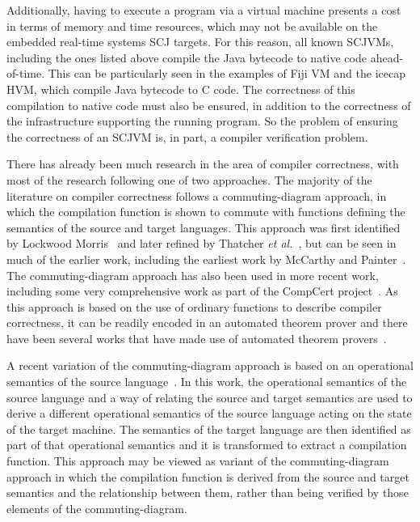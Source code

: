 \documentclass[a4paper,10pt]{report}
\begin{document}
Additionally, having to execute a program via a virtual machine
presents a cost in terms of memory and time resources, which may not
be available on the embedded real-time systems SCJ targets.
For this reason, all known SCJVMs, including the ones listed above
compile the Java bytecode to native code ahead-of-time.
This can be particularly seen in the examples of Fiji VM and the
icecap HVM, which compile Java bytecode to C code.
The correctness of this compilation to native code must also be
ensured, in addition to the correctness of the infrastructure
supporting the running program.
So the problem of ensuring the correctness of an SCJVM is, in part, a
compiler verification problem.

There has already been much research in the area of compiler
correctness, with most of the research following one of two
approaches.
The majority of the literature on compiler correctness follows a
commuting-diagram approach, in which the compilation function is shown
to commute with functions defining the semantics of the source and
target languages.
This approach was first identified by Lockwood
Morris~\cite{morris1973} and later refined by Thatcher \emph{et
  al.}~\cite{thatcher1979}, but can be seen in much of the earlier
work, including the earliest work by McCarthy and
Painter~\cite{mccarthy1967}.
The commuting-diagram approach has also been used in more recent work,
including some very comprehensive work as part of the CompCert
project~\cite{leroy2009a, leroy2009b}.
As this approach is based on the use of ordinary functions to describe
compiler correctness, it can be readily encoded in an automated
theorem prover and there have been several works that have made use of
automated theorem provers~\cite{klein2006, milner1972, nipkow2000}.

A recent variation of the commuting-diagram approach is based on an
operational semantics of the source language~\cite{bahr2015}.
In this work, the operational semantics of the source language and a
way of relating the source and target semantics are used to derive a
different operational semantics of the source language acting on the
state of the target machine.
The semantics of the target language are then identified as part of
that operational semantics and it is transformed to extract a
compilation function.
This approach may be viewed as variant of the commuting-diagram
approach in which the compilation function is derived from the source
and target semantics and the relationship between them, rather than
being verified by those elements of the commuting-diagram.
\end{document}
